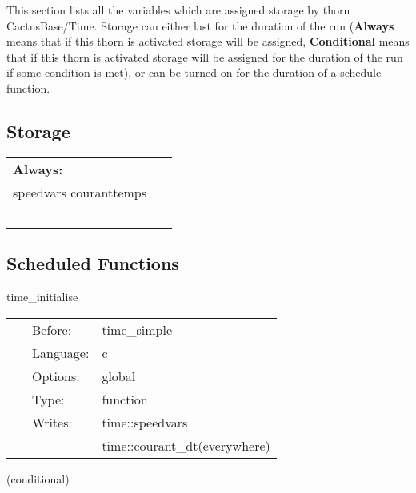 \documentclass{article}
\begin{document}
\noindent This section lists all the variables which are assigned storage by thorn CactusBase/Time.  Storage can either last for the duration of the run ({\bf Always} means that if this thorn is activated storage will be assigned, {\bf Conditional} means that if this thorn is activated storage will be assigned for the duration of the run if some condition is met), or can be turned on for the duration of a schedule function.


\subsection*{Storage}

\hspace{5mm}

 \begin{tabular*}{160mm}{ll} 

{\bf Always:}&  ~ \\ 
 speedvars couranttemps & ~\\ 
~ & ~\\ 
\end{tabular*} 


\subsection*{Scheduled Functions}
\vspace{5mm}


\hspace{5mm} time\_initialise 

\hspace{5mm}{\it initialise time variables } 


\hspace{5mm}

 \begin{tabular*}{160mm}{cll} 
~ & Before:  & time\_simple \\ 
~ & Language:  & c \\ 
~ & Options:  & global \\ 
~ & Type:  & function \\ 
~ & Writes:  & time::speedvars \\ 
~& ~ &time::courant\_dt(everywhere)\\ 
\end{tabular*} 


\vspace{5mm}

   (conditional) 
\end{document}
